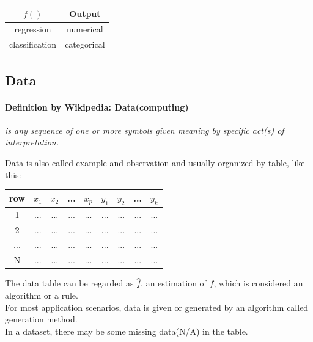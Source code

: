 \documentclass{article}
\begin{document}
{{{            \begin{center}{
                \begin{tabular}{|c|c|}
                \hline
                $f()$ & Output\\
                \hline
                regression & numerical \\
                \hline
                classification & categorical \\
                \hline
                \end{tabular}
            }
            \end{center}   
        }
    }
    \subsection{Data}{
        \paragraph{Definition by Wikipedia: Data(computing)}{
            \textit{is any sequence of one or more symbols given meaning by specific act(s) of interpretation.\\
        }
        
        Data is also called example and observation and usually organized by table, like this:

        \begin{center}{
            \begin{tabular}{|c|c|c|c|c|c|c|c|c|}
            \hline
            row & $x_1$ & $x_2$ & ... & $x_p$ & $y_1$ & $y_2$ & ... & $y_k$\\
            \hline
            1 & ... & ... & ... & ... & ... & ... & ... & ... \\
            \hline
            2 & ... & ... & ... & ... & ... & ... & ... & ... \\
            \hline
            ... & ... & ... & ... & ... & ... & ... & ... & ... \\
            \hline
            N & ... & ... & ... & ... & ... & ... & ... & ... \\
            \hline
            \end{tabular}
        }
        \end{center} 

        The data table can be regarded as \(\hat{f}\), an estimation of $f$, which is considered an algorithm or a rule.\\
        For most application scenarios, data is given or generated by an algorithm called generation method.\\
        In a dataset, there may be some missing data(N/A) in the table.\\
    }

}}
\end{document}
